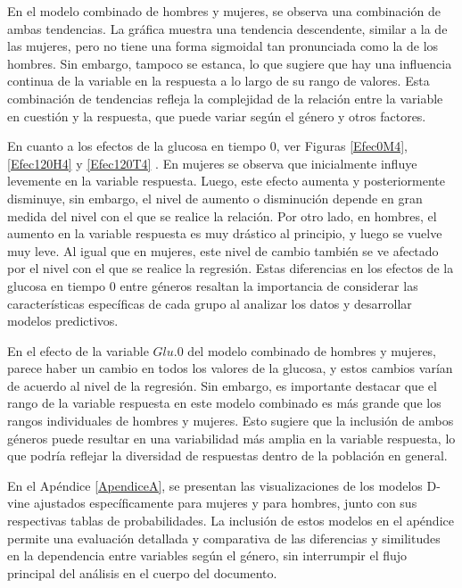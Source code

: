 En el modelo combinado de hombres y mujeres, se observa una combinación de ambas tendencias. La gráfica muestra una tendencia descendente, similar a la de las mujeres, pero no tiene una forma sigmoidal tan pronunciada como la de los hombres. Sin embargo, tampoco se estanca, lo que sugiere que hay una influencia continua de la variable en la respuesta a lo largo de su rango de valores. Esta combinación de tendencias refleja la complejidad de la relación entre la variable en cuestión y la respuesta, que puede variar según el género y otros factores.

En cuanto a los efectos de la glucosa en tiempo $0$, ver Figuras \ref{Efec0M4}, \ref{Efec120H4} y \ref{Efec120T4} . En mujeres se observa que inicialmente influye levemente en la variable respuesta. Luego, este efecto aumenta y posteriormente disminuye, sin embargo, el nivel de aumento o disminución depende en gran medida del nivel con el que se realice la relación. Por otro lado, en hombres, el aumento en la variable respuesta es muy drástico al principio, y luego se vuelve muy leve. Al igual que en mujeres, este nivel de cambio también se ve afectado por el nivel con el que se realice la regresión. Estas diferencias en los efectos de la glucosa en tiempo $0$ entre géneros resaltan la importancia de considerar las características específicas de cada grupo al analizar los datos y desarrollar modelos predictivos.


En el efecto de la variable $Glu.0$ del modelo combinado de hombres y mujeres, parece haber un cambio en todos los valores de la glucosa, y estos cambios varían de acuerdo al nivel de la regresión. Sin embargo, es importante destacar que el rango de la variable respuesta en este modelo combinado es más grande que los rangos individuales de hombres y mujeres. Esto sugiere que la inclusión de ambos géneros puede resultar en una variabilidad más amplia en la variable respuesta, lo que podría reflejar la diversidad de respuestas dentro de la población en general.

En el Apéndice \ref{ApendiceA}, se presentan las visualizaciones de los modelos D-vine ajustados específicamente para mujeres y para hombres, junto con sus respectivas tablas de probabilidades. La inclusión de estos modelos en el apéndice permite una evaluación detallada y comparativa de las diferencias y similitudes en la dependencia entre variables según el género, sin interrumpir el flujo principal del análisis en el cuerpo del documento.